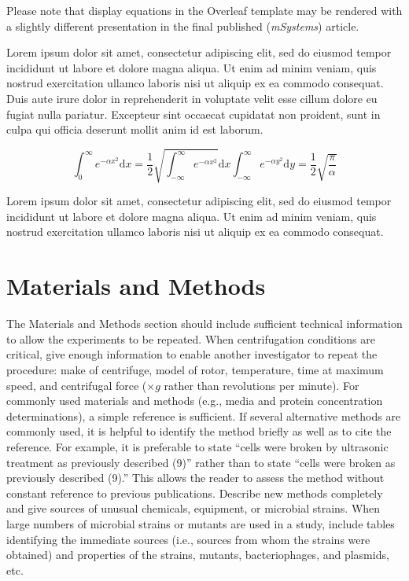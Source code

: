 \documentclass[lineno]{asm-article}
\begin{document}
Please note that display equations in the Overleaf template may be rendered with a slightly different presentation in the final published (\textit{mSystems}) article.

Lorem ipsum dolor sit amet, consectetur adipiscing elit, sed do eiusmod tempor incididunt ut labore et dolore magna aliqua. Ut enim ad minim veniam, quis nostrud exercitation ullamco laboris nisi ut aliquip ex ea commodo consequat. Duis aute irure dolor in reprehenderit in voluptate velit esse cillum dolore eu fugiat nulla pariatur. Excepteur sint occaecat cupidatat non proident, sunt in culpa qui officia deserunt mollit anim id est laborum.

\begin{equation}
\int_0^\infty e^{-\alpha x^2} \mathrm{d}x =
            \frac12\sqrt{\int_{-\infty}^\infty e^{-\alpha x^2}}
            \mathrm{d}x\int_{-\infty}^\infty e^{-\alpha y^2}\mathrm{d}y =
            \frac12\sqrt{\frac{\pi}{\alpha}}
\end{equation}

Lorem ipsum dolor sit amet, consectetur adipiscing elit, sed do eiusmod tempor incididunt ut labore et dolore magna aliqua. Ut enim ad minim veniam, quis nostrud exercitation ullamco laboris nisi ut aliquip ex ea commodo consequat.

\section{Materials and Methods}
The Materials and Methods section should include sufficient technical information to allow the experiments to be repeated. When centrifugation conditions are critical, give enough information to enable another investigator to repeat the  procedure: make of centrifuge, model of rotor, temperature, time at maximum  speed, and centrifugal force ($\times g$ rather than revolutions per minute). For commonly used materials and methods (e.g., media and protein concentration determinations), a simple reference is sufficient. If several alternative methods are commonly used, it is helpful to identify the method briefly as well as to  cite the reference. For example, it is preferable to state ``cells were broken by ultrasonic treatment as previously described (9)'' rather than to state ``cells were broken as previously described (9).'' This allows the reader to assess the method without constant reference  to  previous  publications. Describe  new  methods completely and give sources of unusual chemicals, equipment, or microbial strains. When large numbers of microbial strains or mutants are used in a study, include tables identifying the immediate sources (i.e., sources from whom the strains were obtained)  and  properties  of  the  strains,  mutants,  bacteriophages, and plasmids, etc.
\end{document}
